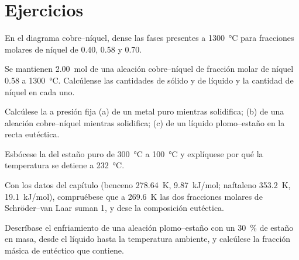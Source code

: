 \section{Ejercicios}

\begin{exercise}[$\star$]\label{exo:b2:solid-liquid-diagrams:1}
En el diagrama cobre--níquel, dense las fases presentes a
\qty{1300}{\degreeCelsius} para fracciones molares de níquel de 0.40, 0.58 y 0.70.
\end{exercise}

\begin{exercise}[$\star$]\label{exo:b2:solid-liquid-diagrams:2}
Se mantienen \qty{2.00}{mol} de una aleación cobre--níquel de fracción molar de níquel 0.58
a \qty{1300}{\degreeCelsius}. Calcúlense las cantidades de sólido y de líquido y la
cantidad de níquel en cada uno.
\end{exercise}

\begin{exercise}[$\star$]\label{exo:b2:solid-liquid-diagrams:3}
Calcúlese la  a presión fija (a) de un metal puro mientras solidifica;
(b) de una aleación cobre--níquel mientras solidifica; (c) de un líquido plomo--estaño en la
recta eutéctica.
\end{exercise}

\begin{exercise}[$\star$]\label{exo:b2:solid-liquid-diagrams:4}
Esbócese la  del estaño puro de \qty{300}{\degreeCelsius} a
\qty{100}{\degreeCelsius} y explíquese por qué la temperatura se detiene a
\qty{232}{\degreeCelsius}.
\end{exercise}

\begin{exercise}[$\star\star$]\label{exo:b2:solid-liquid-diagrams:5}
Con los datos del capítulo (benceno \qty{278.64}{K}, \qty{9.87}{kJ/mol};
naftaleno \qty{353.2}{K}, \qty{19.1}{kJ/mol}), compruébese que a
\qty{269.6}{K} las dos fracciones molares de Schröder--van Laar suman 1, y dese
la composición eutéctica.
\end{exercise}

\begin{exercise}[$\star\star$]\label{exo:b2:solid-liquid-diagrams:6}
Descríbase el enfriamiento de una aleación plomo--estaño con un 30~\% de estaño en masa, desde el líquido
hasta la temperatura ambiente, y calcúlese la fracción másica de eutéctico que contiene.
\end{exercise}

